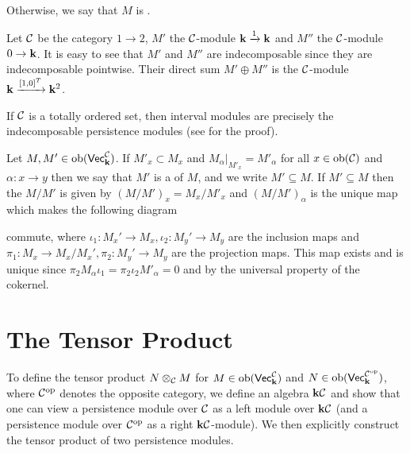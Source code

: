 Otherwise, we say that $M$ is .
\begin{example}\label{example:indecomposableModule}
    Let $\mathcal{C}$ be the category $1\to 2$, $M'$ the $\mathcal{C}$-module $\mathbf{k}\xrightarrow{1}\mathbf{k}$ and $M''$ the $\mathcal{C}$-module $0\to\mathbf{k}$.
    It is easy to see that $M'$ and $M''$ are indecomposable since they are indecomposable pointwise.
    Their direct sum $M'\oplus M''$ is the $\mathcal{C}$-module $\mathbf{k}\xrightarrow{[1,0]^T}\mathbf{k}^2$.
\end{example}
\begin{example}
    If $\mathcal{C}$ is a totally ordered set, then interval modules are precisely the indecomposable persistence modules (see \cite[Section 4]{BotnanCrawley_2018} for the proof).
\end{example}
Let $M,M'\in\operatorname{ob}(\normalfont\mathsf{Vec}_{\mathbf{k}}^{\mathcal{C}})$. If $M'_x\subset M_x$ and $M_\alpha\vert_{M'_x}=M'_\alpha$ for all $x\in\operatorname{ob}(\mathcal{C})$ and $\alpha\colon x\to y$ then we say that $M'$ is a  of $M$, and we write $M'\subseteq M$.
If $M'\subseteq M$ then the  $M/M'$ is given by $(M/M')_x=M_x/M'_x$ and $(M/M')_\alpha$ is the unique map which makes the following diagram
\begin{center}
\end{center}
commute, where $\iota_1\colon M_x'\to M_x, \iota_2\colon M_y'\to M_y$ are the inclusion maps and $\pi_1\colon M_x\to M_x/M_x', \pi_2\colon M_y'\to M_y$ are the projection maps. This map exists and is unique since $\pi_2 M_\alpha\iota_1=\pi_2\iota_2 M'_\alpha=0$ and by the universal property of the cokernel.

\section{The Tensor Product}\label{sec:theTensorProduct}
To define the tensor product $N\otimes_{\mathcal{C}} M$ for $M\in\operatorname{ob}(\normalfont\mathsf{Vec}_{\mathbf{k}}^{\mathcal{C}})$ and $N\in\operatorname{ob}(\normalfont\mathsf{Vec}_{\mathbf{k}}^{\mathcal{C}^{\text{op}}})$, where $\mathcal{C}^{\text{op}}$ denotes the opposite category, we define an algebra $\mathbf{k}\mathcal{C}$ and show that one can view a persistence module over $\mathcal{C}$ as a left module over $\mathbf{k}\mathcal{C}$ (and a persistence module over $\mathcal{C}^{\text{op}}$ as a right $\mathbf{k}\mathcal{C}$-module).
We then explicitly construct the tensor product of two persistence modules.


